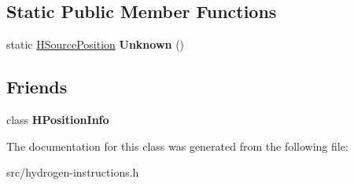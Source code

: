 \subsection*{Static Public Member Functions}
\begin{DoxyCompactItemize}
\item 
\hypertarget{classv8_1_1internal_1_1_h_source_position_aa5fe301ef3fa3932a478ea2deef6b7d6}{}static \hyperlink{classv8_1_1internal_1_1_h_source_position}{H\+Source\+Position} {\bfseries Unknown} ()\label{classv8_1_1internal_1_1_h_source_position_aa5fe301ef3fa3932a478ea2deef6b7d6}

\end{DoxyCompactItemize}
\subsection*{Friends}
\begin{DoxyCompactItemize}
\item 
\hypertarget{classv8_1_1internal_1_1_h_source_position_a603ac2edcbd20d89b6fe13b83ef98ceb}{}class {\bfseries H\+Position\+Info}\label{classv8_1_1internal_1_1_h_source_position_a603ac2edcbd20d89b6fe13b83ef98ceb}

\end{DoxyCompactItemize}


The documentation for this class was generated from the following file\+:\begin{DoxyCompactItemize}
\item 
src/hydrogen-\/instructions.\+h\end{DoxyCompactItemize}
